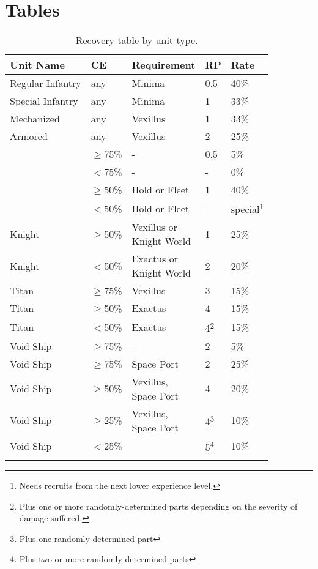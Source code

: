 \chapter{Tables}
\begin{center}
 \begin{longtable}{l l l l l}\toprule
	Unit Name & CE & Requirement & RP & Rate \\ \endhead\midrule
	Regular Infantry & any & Minima & 0.5 & 40\% \\
	Special Infantry & any & Minima & 1 & 33\% \\
	Mechanized & any & Vexillus & 1 & 33\% \\
	Armored & any & Vexillus & 2 & 25\% \\
	\makecell[cl]{Astartes} & $\ge$75\% & - & 0.5 & 5\%\\
	\makecell[cl]{Astartes} & $<$75\% & - & - & 0\%\\  
	\makecell[cl]{Astartes} & $\ge$50\% & Hold or Fleet & 1 & 40\%\\
	\makecell[cl]{Astartes} & $<$50\% & Hold or Fleet & - & special\footnote{Needs recruits from the next lower experience level.}\\
	Knight & $\ge$50\% & \makecell[lc]{Vexillus or\\Knight World} & 1 & 25\%\\
	Knight & $<$50\% & \makecell[lc]{Exactus or\\Knight World} & 2 & 20\%\\
	Titan & $\ge$75\% & Vexillus & 3 & 15\% \\
	Titan & $\ge$50\% & Exactus & 4 & 15\% \\
	Titan & $<$50\% & Exactus & 4\footnote{Plus one or more randomly-determined parts depending on the severity of damage suffered.} & 15\% \\
	Void Ship & $\ge$75\% & - & 2 & 5\%\\
	Void Ship & $\ge$75\% & Space Port & 2 & 25\%\\
	Void Ship & $\ge$50\% & \makecell[cl]{Vexillus,\\Space Port} & 4 & 20\%\\
	Void Ship & $\ge$25\% & \makecell[cl]{Vexillus,\\Space Port} & 4\footnote{Plus one randomly-determined part} & 10\%\\
	Void Ship & $<$25\% & \makecell[cl]{Exactus} & 5\footnote{Plus two or more randomly-determined parts}  & 10\%\\
	\bottomrule
	\caption{Recovery table by unit type.\label{recovery_table}}\\
\end{longtable}	
\end{center}

